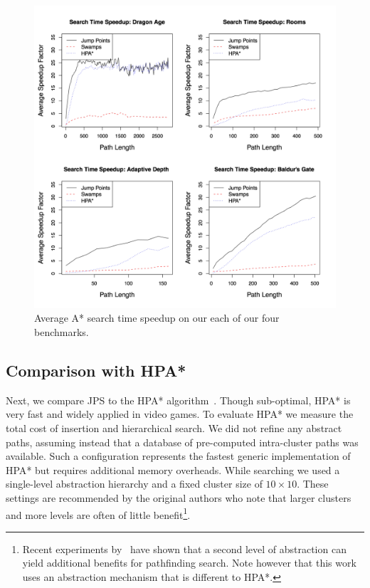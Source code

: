 \begin{figure}[t!]
   \begin{center}
	   \includegraphics[width=0.98\columnwidth]
		{chapter_jps/diagrams/speedup.pdf}
   \end{center}
   \caption[Search time speedup: JPS vs. Swamps vs. HPA]
{\small
Average A{*} search time speedup on our each of our four benchmarks. }

\label{fig::jps::speedup}
\end{figure}


\subsection{Comparison with HPA{*}}
Next, we compare JPS to the HPA{*} algorithm~\citep{botea04}.  Though
sub-optimal, HPA{*} is very fast and widely applied in video games.  To evaluate
HPA{*} we measure the total cost of insertion and hierarchical search. We did
not refine any abstract paths, assuming instead that a database of
pre-computed intra-cluster paths was available. Such a configuration
represents the fastest generic implementation of HPA{*} but requires additional
memory overheads.  While searching we used a single-level abstraction
hierarchy and a fixed cluster size of $10\times10$.  These settings are
recommended by the original authors who note that larger clusters and more
levels are often of little benefit\footnote{Recent experiments by~
\cite{sturtevant10} have shown that a second level of abstraction can yield
additional benefits for pathfinding search. Note however that this work uses an
abstraction mechanism that is different to HPA{*}.}.

